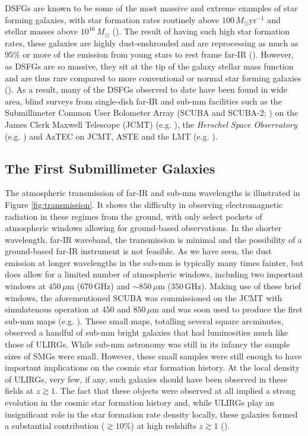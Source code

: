 DSFGs are known to be some of the most massive and extreme examples of star forming galaxies, with star formation rates routinely above $100\,M_\odot$yr$^{-1}$ and stellar masses above $10^{10}\,M_\odot$ (\citealt{Borys_2005, Michalowski_2010, Hainline_2011}). The result of having such high star formation rates, these galaxies are highly dust-enshrouded and are reprocessing as much as $95\%$ or more of the emission from young stars to rest frame far-IR (\citealt{Blain_2002, Casey_2014b}). However, as DSFGs are so massive, they sit at the tip of the galaxy stellar mass function and are thus rare compared to more conventional or normal star forming galaxies (\citealt{Chapman_2005}). As a result, many of the DSFGs observed to date have been found in wide area, blind surveys from single-dish far-IR and sub-mm facilities such as the Submillimeter Common User Bolometer Array (SCUBA and SCUBA-2; \citealt{Holland_1999, Holland_2013}) on the James Clerk Maxwell Telescope (JCMT) (e.g. \citealt{Smail_1997, Hughes_1998}), the \textit{Herschel Space Observatory} (e.g. \citealt{Eales_2010, Elbaz_2011, Oliver_2012}) and AzTEC on JCMT, ASTE and the LMT (e.g. \citealt{Scott_2008, Aretxaga_2011}).

\subsection{The First Submillimeter Galaxies}
\label{sec:first_submm_galaxies}

The atmospheric transmission of far-IR and sub-mm wavelengths is illustrated in Figure \ref{fig:transmission}. It shows the difficulty in observing electromagnetic radiation in these regimes from the ground, with only select pockets of atmospheric windows allowing for ground-based observations. In the shorter wavelength, far-IR waveband, the transmission is minimal and the possibility of a ground-based far-IR instrument is not feasible. As we have seen, the dust emission at longer wavelengths in the sub-mm is typically many times fainter, but does allow for a limited number of atmospheric windows, including two important windows at $450\,\mu$m ($670\,$GHz) and $\sim 850\,\mu$m ($350\,$GHz). Making use of these brief windows, the aforementioned SCUBA was commissioned on the JCMT with simulatenous operation at $450$ and $850\,\mu$m and was soon used to produce the first sub-mm maps (e.g. \citealt{Smail_1997, Barger_1998, Hughes_1998}). These small maps, totalling several square arcminutes, observed a handful of sub-mm bright galaxies that had luminosities much like those of ULIRGs. While sub-mm astronomy was still in its infancy the sample sizes of SMGs were small. However, these small samples were still enough to have important implications on the cosmic star formation history. At the local density of ULIRGs, very few, if any, such galaxies should have been observed in these fields at $z \gtrsim 1$. The fact that these objects were observed at all implied a strong evolution in the cosmic star formation history and, while ULIRGs play an insignificant role in the star formation rate density locally, these galaxies formed a substantial contribution ($\gtrsim 10\%$) at high redshifts $z \gtrsim 1$ (\citealt{Casey_2014b}). 


